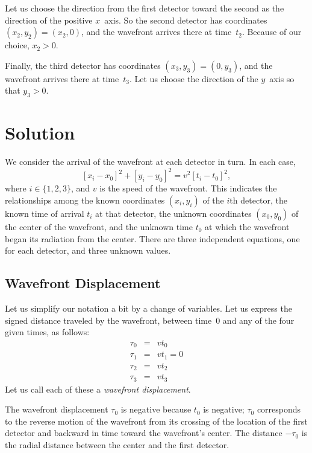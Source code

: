 \documentclass[twocolumn]{article}
\begin{document}
Let us choose the direction from the first detector toward the second
as the direction of the positive $x$~axis.  So the second detector has
coordinates $(x_2, y_2) = (x_2, 0)$, and the wavefront arrives there at
time~$t_2$.  Because of our choice, $x_2 > 0$.

Finally, the third detector has coordinates $(x_3, y_3) = (0, y_3)$, and the
wavefront arrives there at time~$t_3$.  Let us choose the direction of the
$y$~axis so that $y_3 > 0$.

\section{Solution}

We consider the arrival of the wavefront at each detector in turn.  In each
case,
\begin{equation}
   \left[x_i - x_0\right]^2 + \left[y_i - y_0\right]^2 = v^2 \left[t_i -
   t_0\right]^2,
\end{equation}
where $i \in \{1, 2, 3\}$, and $v$ is the speed of the wavefront.  This
indicates the relationships among the known coordinates $(x_i, y_i)$ of the
$i$th detector, the known time of arrival $t_i$ at that detector, the unknown
coordinates $(x_0, y_0)$ of the center of the wavefront, and the unknown time
$t_0$ at which the wavefront began its radiation from the center.  There are
three independent equations, one for each detector, and three unknown values.

\subsection{Wavefront Displacement}

Let us simplify our notation a bit by a change of variables.  Let us express
the signed distance traveled by the wavefront, between time~0 and any of the
four given times, as follows:
\begin{eqnarray}
   \tau_0 &=& vt_0\\
   \tau_1 &=& vt_1 = 0\\
   \tau_2 &=& vt_2\\
   \tau_3 &=& vt_3
\end{eqnarray}
Let us call each of these a \emph{wavefront displacement}.

The wavefront displacement $\tau_0$ is negative because $t_0$ is negative;
$\tau_0$ corresponds to the reverse motion of the wavefront from its crossing
of the location of the first detector and backward in time toward the
wavefront's center.  The distance $-\tau_0$ is the radial distance between the
center and the first detector.
\end{document}
